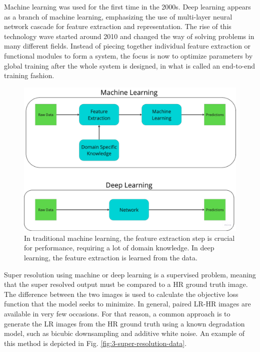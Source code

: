     Machine learning was used for the first time in the 2000s. 
    Deep learning appears as a branch of machine learning, emphasizing the use of multi-layer neural network cascade for feature extraction and representation. 
    The rise of this technology wave started around 2010 and changed the way of solving problems in many different fields.
    Instead of piecing together individual feature extraction or functional modules to form a system, the focus is now to optimize parameters by global training after the whole system is designed, in what is called an end-to-end training fashion.

    \begin{figure}[H]
        \centering
        \includegraphics[width=\textwidth]{Includes/2-end-to-end-training.pdf}
        \caption{In traditional machine learning, the feature extraction step is crucial for performance, requiring a lot of domain knowledge. In deep learning, the feature extraction is learned from the data.}
        \label{fig:2-end-to-end-training}
    \end{figure}

    Super resolution using machine or deep learning is a supervised problem, meaning that the super resolved output must be compared to a HR ground truth image. 
    The difference between the two images is used to calculate the objective loss function that the model seeks to minimize.
    In general, paired LR-HR images are available in very few occasions.
    For that reason, a common approach is to generate the LR images from the HR ground truth using a known degradation model, such as bicubic downsampling and additive white noise. An example of this method is depicted in Fig. \ref{fig:3-super-resolution-data}. 
    

